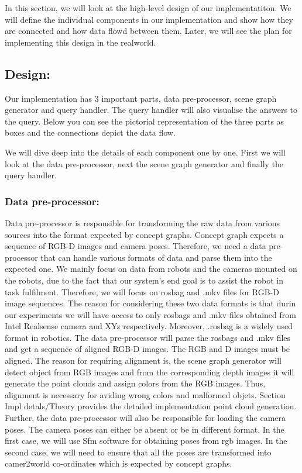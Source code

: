In this section, we will look at the high-level design of our implementatiton. We will define the individual components in our
implementation and show how they are connected and how data flowd between them. Later, we will see the plan for implementing this 
design in the realworld.

\subsection{Design:}
Our implementation has 3 important parts, data pre-processor, scene graph generator and query handler. The query handler will also visualise
the answers to the query. Below you can see the pictorial representation of the three parts as boxes and the connections depict the data flow.






We will dive deep into the details of each component one by one. First we will look at the data pre-processor, next the scene graph generator and finally 
the query handler.

\subsubsection{Data pre-processor:}
Data pre-processor is responsible for transforming the raw data from various sources into the format expected by concept graphs. 
Concept graph expects a sequence of RGB-D images and camera poses. Therefore, we need a data pre-processor that can handle various formats of data
and parse them into the expected one.  We mainly focus on data from robots and the cameras mounted on the robots, due to the fact that our system's end goal 
is to assist the robot in task fulfilment. 
Therefore, we will focus on rosbag and .mkv files for RGB-D image sequences. The reason for considering these two data formats is that durin our experiments
we will have access to only rosbags and .mkv files obtained from Intel Realsense camera and XYz respectively. Moreover, .rosbag is a widely used format in robotics.
The data pre-processor will parse the rosbags and .mkv files  and get a sequence of aligned RGB-D images. 
The RGB and D images must be aligned. The reason for requiring alignment is, the scene graph 
generator will detect object from RGB images and from the corresponding depth images it will generate the point clouds and assign colors from 
the RGB images. Thus, alignment is necessary for aviding wrong colors and malformed objets. Section Impl detals/Theory provides the detailed 
implementation point cloud generation. 
Further, the data pre-processor will also be responsible for loading the camera poses. The camera poses can either be absent or be in 
different format. In the first case, we will use Sfm software for obtaining poses from rgb images. In the second case, we will need to
ensure that all the poses are transformed into camer2world co-ordinates which is expected by concept graphs.

